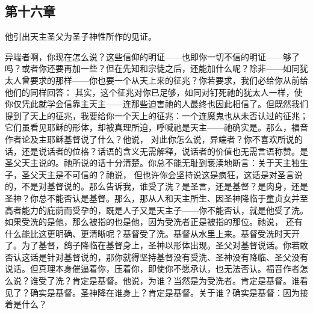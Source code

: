
\subsection{第十六章}

他引出天主圣父为圣子神性所作的见证。\par

异端者啊，你现在怎么说？这些信仰的明证——也即你一切不信的明证——够了吗？或者你还要再加一些？但在先知和宗徒之后，还能加什么呢？除非——如同犹太人曾要求的那样——你也要一个从天上来的征兆？你若要求，我们必给你从前给他们的同样回答： 其实，这个征兆对你已足够，如同对钉死祂的犹太人一样，使你仅凭此就学会信靠主天主——连那些迫害祂的人最终也因此相信了。但既然我们提到了天上的征兆，我要给你一个天上的征兆：一个连魔鬼也从未否认过的征兆；它们虽看见耶稣的形体，却被真理所迫，呼喊祂是天主——祂确实是。那么，福音作者论及主耶稣基督说了什么？他说， 对此你怎么说，异端者？你不喜欢所说的话，还是说话者的位格？话语的含义无需解释，说话者的价值也无需言语称赞。是圣父天主说的。祂所说的话十分清楚。你总不能无耻到亵渎地断言：关于天主独生子，圣父天主是不可信的？祂说， 但也许你会坚持说这是疯狂，这话是对圣言说的，不是对基督说的。那么告诉我，谁受了洗？是圣言，还是基督？是肉身，还是圣神？你总不能否认是基督。那么，那从人和天主所生、因圣神降临于童贞女并至高者能力的庇荫而受孕的，既是人子又是天主子——你不能否认，就是他受了洗。如果受洗的是他，那么被指的也是他，因为受洗者正是被指的那位。祂说， 还有什么能比这更明确、更清晰呢？基督受了洗。基督从水里上来。基督受洗时天开了。为了基督，鸽子降临在基督身上，圣神以形体出现。圣父对基督说话。你若敢否认这话是针对基督说的，那你就得坚持基督没有受洗、圣神没有降临、圣父没有说话。但真理本身催逼着你，压着你，即使你不愿承认，也无法否认。福音作者怎么说？谁受了洗？肯定是基督。他说，为谁？当然是为受洗者。肯定是基督。谁看见了？确实是基督。圣神降在谁身上？肯定是基督。关于谁？确实是基督：因为接着是什么？ 
